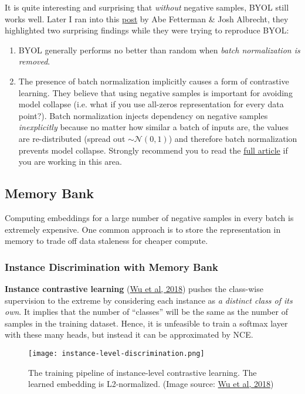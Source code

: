 \documentclass[12pt]{article}
\begin{document}
It is quite interesting and surprising that \emph{without} negative samples, BYOL still works well. Later I ran into this \href{https://untitled-ai.github.io/understanding-self-supervised-contrastive-learning.html}{post} by Abe Fetterman \& Josh Albrecht, they highlighted two surprising findings while they were trying to reproduce BYOL:
\begin{enumerate}
    \item BYOL generally performs no better than random when \emph{batch normalization is removed}.
    \item The presence of batch normalization implicitly causes a form of contrastive learning. They believe that using negative samples is important for avoiding model collapse (i.e. what if you use all-zeros representation for every data point?). Batch normalization injects dependency on negative samples \emph{inexplicitly} because no matter how similar a batch of inputs are, the values are re-distributed (spread out $\sim \mathcal{N}(0, 1)$) and therefore batch normalization prevents model collapse. Strongly recommend you to read the \href{https://untitled-ai.github.io/understanding-self-supervised-contrastive-learning.html}{full article} if you are working in this area.
\end{enumerate}

\subsection{Memory Bank}

Computing embeddings for a large number of negative samples in every batch is extremely expensive. One common approach is to store the representation in memory to trade off data staleness for cheaper compute.

\subsubsection{Instance Discrimination with Memory Bank}

\textbf{Instance contrastive learning} (\href{https://arxiv.org/abs/1805.01978v1}{Wu et al, 2018}) pushes the class-wise supervision to the extreme by considering each instance as \emph{a distinct class of its own}. It implies that the number of ``classes'' will be the same as the number of samples in the training dataset. Hence, it is unfeasible to train a softmax layer with these many heads, but instead it can be approximated by NCE.

\begin{figure}[H]
    \centering
    \texttt{[image: instance-level-discrimination.png]}
    \caption{The training pipeline of instance-level contrastive learning. The learned embedding is L2-normalized. (Image source: \href{https://arxiv.org/abs/1805.01978v1}{Wu et al, 2018})}
\end{figure}
\end{document}
